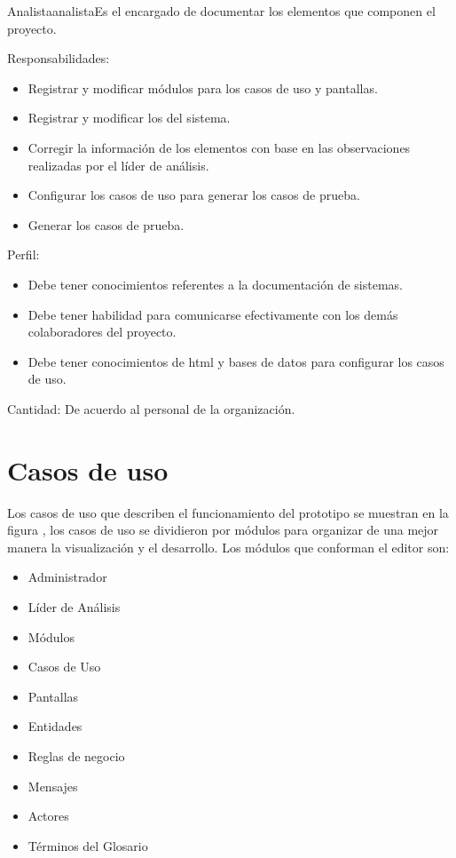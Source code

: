 \begin{actor}{Analista}{analista}{Es el encargado de documentar los elementos que componen el proyecto.}
    \item[Responsabilidades:] \hspace{1pt}
    \begin{itemize}
	\item Registrar y modificar módulos para los casos de uso y pantallas.
	\item Registrar y modificar los  del sistema.
	\item Corregir la información de los elementos con base en las observaciones realizadas por el líder de análisis.
	\item Configurar los casos de uso para generar los casos de prueba.
	\item Generar los casos de prueba.
    \end{itemize}
    \item[Perfil:] \hspace{1pt}
    \begin{itemize}
	\item Debe tener conocimientos referentes a la documentación de sistemas.
	\item Debe tener habilidad para comunicarse efectivamente con los demás colaboradores del proyecto.
	\item Debe tener conocimientos de html y bases de datos para configurar los casos de uso.
    \end{itemize}
    \item[Cantidad:] De acuerdo al personal de la organización.
\end{actor}


\clearpage
\section{Casos de uso}
Los casos de uso que describen el funcionamiento del prototipo se muestran en la figura , 
los casos de uso se dividieron por módulos para organizar de una mejor manera la visualización y el desarrollo. Los módulos
que conforman el editor son:
\begin{itemize}
	\item Administrador
	\item Líder de Análisis
	\item Módulos
	\item Casos de Uso
	\item Pantallas
	\item Entidades
	\item Reglas de negocio
	\item Mensajes
	\item Actores
	\item Términos del Glosario
\end{itemize}

